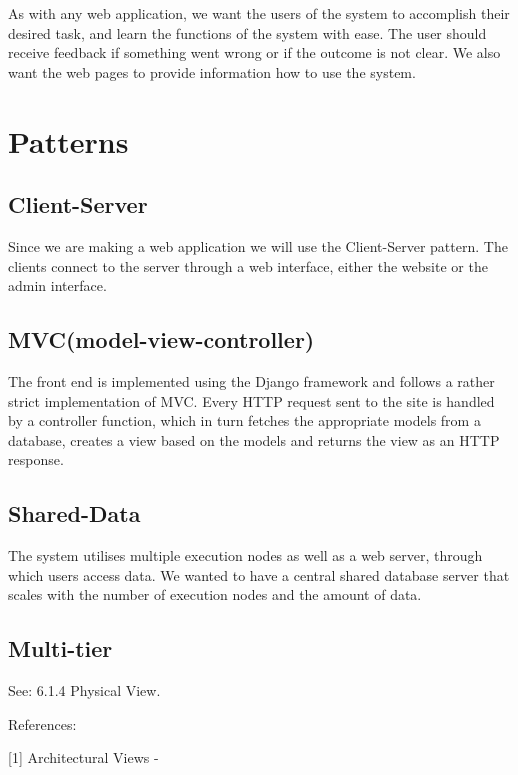 As with any web application, we want the users of the system to
accomplish their desired task, and learn the functions of the system
with ease. The user should receive feedback if something went wrong or
if the outcome is not clear. We also want the web pages to provide
information how to use the system. \ 

\section{Patterns}

\subsection{Client-Server}

Since we are making a web application we will use the Client-Server
pattern. The clients connect to the server through a web interface,
either the website or the admin interface. 

\subsection{MVC(model-view-controller)}

The front end is implemented using the Django framework and follows a
rather strict implementation of MVC. Every HTTP request sent to the
site is handled by a controller function, which in turn fetches the
appropriate models from a database, creates a view based on the models
and returns the view as an HTTP response. 

\subsection{Shared-Data}

The system utilises multiple execution nodes as well as a web server,
through which users access data. We wanted to have a central shared
database server that scales with the number of execution nodes and the
amount of data. 

\subsection{Multi-tier}

See: 6.1.4 Physical View.


\bigskip


\bigskip

References:

[1] Architectural Views -

